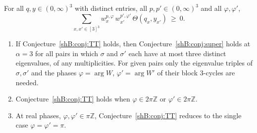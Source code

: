 \begin{conjecture}\label{shB:conj:TT}
For all $q,y\in(0,\infty)^3$ with distinct entries, all $p,p'\in(0,\infty)^3$ and all $\varphi,\varphi'$,
\[
\sum_{x,x'\in[3]^3}w^{p,\varphi}_x\,w^{p',\varphi'}_{x'}\,\Theta(q_x,y_{x'})\ \ge\ 0 .
\]
\end{conjecture}

\begin{proposition}\label{shB:prop:twisted}
\begin{enumerate}[label=(\alph*)]
\item If Conjecture~\ref{shB:conj:TT} holds, then Conjecture~\ref{shB:conj:super} holds at $\alpha=3$ for all pairs in which $\sigma$ and $\sigma'$ each have at most three distinct eigenvalues, of any multiplicities. For given pairs only the eigenvalue triples of $\sigma,\sigma'$ and the phases $\varphi=\arg W$, $\varphi'=\arg W'$ of their block $3$-cycles are needed.
\item Conjecture~\ref{shB:conj:TT} holds when $\varphi\in2\pi\mathbb Z$ or $\varphi'\in2\pi\mathbb Z$.
\item At real phases, $\varphi,\varphi'\in\pi\mathbb Z$, Conjecture~\ref{shB:conj:TT} reduces to the single case $\varphi=\varphi'=\pi$.
\end{enumerate}
\end{proposition}

